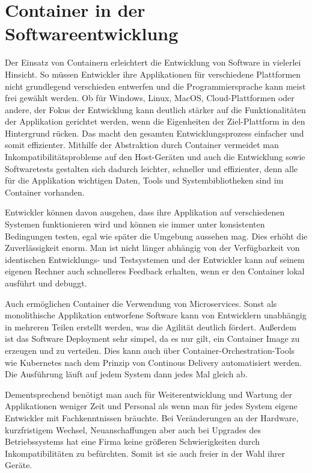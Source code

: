 \section{Container in der Softwareentwicklung} 
\label{sec:Softwareentwicklung}

Der Einsatz von Containern erleichtert die Entwicklung von Software in vielerlei Hinsicht. So müssen Entwickler ihre Applikationen für verschiedene Plattformen nicht grundlegend verschieden entwerfen und die Programmiersprache kann meist frei gewählt werden. 
Ob für Windows, Linux, MacOS, Cloud-Plattformen oder andere, der Fokus der Entwicklung kann deutlich stärker auf die Funktionalitäten der Applikation gerichtet werden, wenn die Eigenheiten der Ziel-Plattform in den Hintergrund rücken. Das macht den gesamten Entwicklungsprozess einfacher und somit effizienter.
Mithilfe der Abstraktion durch Container vermeidet man Inkompatibilitätsprobleme auf den Host-Geräten und auch die Entwicklung sowie Softwaretests gestalten sich dadurch leichter, schneller und effizienter, denn alle für die Applikation wichtigen Daten, Tools und Systembibliotheken sind im Container vorhanden.
\citep{11517836120160501}

Entwickler können davon ausgehen, dass ihre Applikation auf verschiedenen Systemen funktionieren wird und können sie immer unter konsistenten Bedingungen testen, egal wie später die Umgebung aussehen mag. Dies erhöht die Zuverlässigkeit enorm. Man ist nicht länger abhängig von der Verfügbarkeit von identischen Entwicklungs- und Testsystemen und der Entwickler kann auf seinem eigenen Rechner auch schnelleres Feedback erhalten, wenn er den Container lokal ausführt und debuggt.

Auch ermöglichen Container die Verwendung von Microservices. Sonst als monolithische Applikation entworfene Software kann von Entwicklern unabhängig in mehreren Teilen erstellt werden, was die Agilität deutlich fördert.
Außerdem ist das Software Deployment sehr simpel, da es nur gilt, ein Container Image zu erzeugen und zu verteilen. Dies kann auch über Container-Orchestration-Tools wie Kubernetes nach dem Prinzip von Continous Delivery automatisiert werden. Die Ausführung läuft auf jedem System dann jedes Mal gleich ab.
\citep{ItAgil}

Dementsprechend benötigt man auch für Weiterentwicklung und Wartung der Applikationen weniger Zeit und Personal als wenn man für jedes System eigene Entwickler mit Fachkenntnissen bräuchte.
Bei Veränderungen an der Hardware, kurzfristigem Wechsel, Neuanschaffungen aber auch bei Upgrades des Betriebssystems hat eine Firma keine größeren Schwierigkeiten durch Inkompatibilitäten zu befürchten. Somit ist sie auch freier in der Wahl ihrer Geräte.

